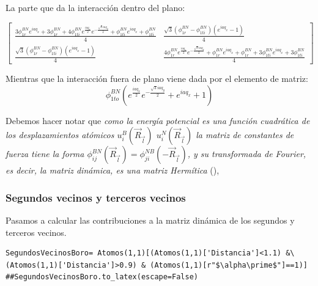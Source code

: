 \documentclass[12pt,a4paper]{article}
\begin{document}
La parte que da la interacción dentro del plano:

\begin{equation}
\label{eq:10}
\left[\begin{matrix}\frac{3 \phi^{BN}_{1r} e^{i a q_{x}} + 3 \phi^{BN}_{1r} + 4 \phi^{BN}_{1ti} e^{\frac{i a q_{x}}{2}} e^{- \frac{\sqrt{3} i a q_{y}}{2}} + \phi^{BN}_{1ti} e^{i a q_{x}} + \phi^{BN}_{1ti}}{4} & \frac{\sqrt{3} \left(\phi^{BN}_{1r} - \phi^{BN}_{1ti}\right) \left(e^{i a q_{x}} - 1\right)}{4}\\\frac{\sqrt{3} \left(\phi^{BN}_{1r} - \phi^{BN}_{1ti}\right) \left(e^{i a q_{x}} - 1\right)}{4} & \frac{4 \phi^{BN}_{1r} e^{\frac{i a q_{x}}{2}} e^{- \frac{\sqrt{3} i a q_{y}}{2}} + \phi^{BN}_{1r} e^{i a q_{x}} + \phi^{BN}_{1r} + 3 \phi^{BN}_{1ti} e^{i a q_{x}} + 3 \phi^{BN}_{1ti}}{4}\end{matrix}\right]
\end{equation}

Mientras que la interacción fuera de plano viene dada por el elemento de matriz:
\begin{equation}
\label{eq:12}
\phi^{BN}_{1to} \left(e^{\frac{i a q_{x}}{2}} e^{- \frac{\sqrt{3} i a q_{y}}{2}} + e^{i a q_{x}} + 1\right)
\end{equation}


Debemos hacer notar que \emph{como la energía potencial es una función cuadrática de los desplazamientos atómicos \(u^B_i(\vec R_{\vec l})\) \(u^N_i(\vec R_{\vec l})\) la matriz de constantes de fuerza tiene la forma \(\phi_{ij}^{BN}(\vec R_{\vec l})=\phi_{ji}^{NB}(-\vec R_{\vec l})\), y su transformada de Fourier, es decir, la matriz dinámica, es una matriz Hermítica} (\cite{falkovsky08_symmet_const_phonon_disper_graph}), 

\newpage
\eject \pdfpagewidth=210mm \pdfpageheight=297mm

\subsubsection{Segundos vecinos y terceros vecinos}
\label{sec:orga1f6342}

Pasamos a calcular las contribuciones a la matriz dinámica de los segundos y terceros vecinos.

\begin{verbatim}
SegundosVecinosBoro= Atomos(1,1)[(Atomos(1,1)['Distancia']<1.1) &\
(Atomos(1,1)['Distancia']>0.9) & (Atomos(1,1)[r"$\alpha\prime$"]==1)]
##SegundosVecinosBoro.to_latex(escape=False)
\end{verbatim}
\end{document}
